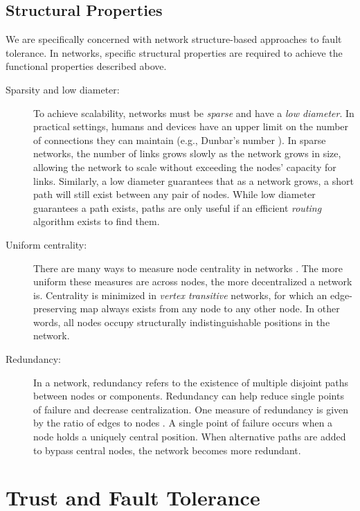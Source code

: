 \documentclass{sig-alternate-05-2015}
\begin{document}
\subsection{Structural Properties}

We are specifically concerned with network structure-based approaches to
fault tolerance.
In networks, specific structural properties are required to achieve the
functional properties described above.
\begin{description}
\item [Sparsity and low diameter:]
To achieve scalability, networks must be {\em sparse} and have a
{\em low diameter}.
In practical settings, humans and devices have an upper limit on the number
of connections they can maintain (e.g., Dunbar's number
\cite{dunbar_neocortex_1992}).
In sparse networks, the number of links grows slowly as the network grows in
size, allowing the network to scale without exceeding the nodes' capacity for
links.
Similarly, a low diameter guarantees that as a network grows, a short path will
still exist between any pair of nodes.
While low diameter guarantees a path exists,
paths are only useful if an efficient {\em routing} algorithm exists
to find them.

\item [Uniform centrality:]
There are many ways to measure node centrality in networks
\cite{freeman_centrality_1978}.
The more uniform these measures are across nodes, the more decentralized
a network is.
Centrality is minimized in {\em vertex transitive} networks,
for which an edge-preserving map
always exists from any node to any other node.
In other words, all nodes occupy structurally indistinguishable positions
in the network.

\item [Redundancy:]
In a network, redundancy refers to the existence of multiple disjoint
paths between nodes or components.
Redundancy can help reduce single points of failure and decrease
centralization.
One measure of redundancy is given by the ratio of edges to nodes
\cite{baran_distributed_1964}.
A single point of failure occurs when a node holds a uniquely
central position.
When alternative paths are added to bypass central nodes,
the network becomes more redundant.

\end{description}

\section{Trust and Fault Tolerance}
\label{sec-ft}
\end{document}
